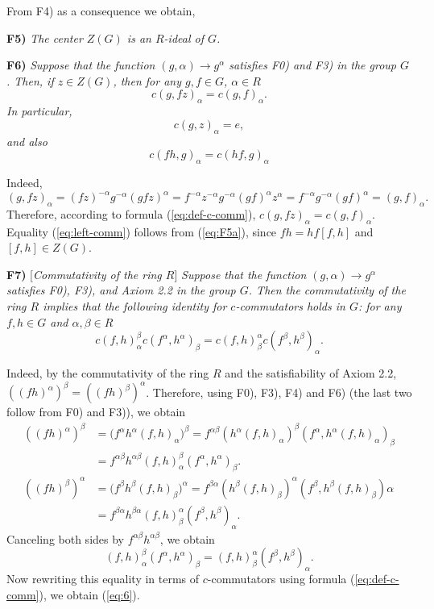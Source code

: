 \documentclass[11pt]{article}
\theoremstyle{definition}
\begin{document}
From F4) as a consequence we obtain,

\medskip
\noindent 
{\bf F5)} {\it The center $Z(G)$ is an $R$-ideal of $G$.} 

\medskip
\noindent 
{\bf F6)} {\it Suppose that the function $(g,\alpha) \to g^\alpha$ satisfies F0) and F3) in the group $G$. Then, if $z \in Z(G)$, then for any $g,f \in G$, $\alpha \in R$
\begin{equation} \label{eq:F5a}
    c(g,fz)_\alpha = c(g,f)_\alpha.
    \end{equation}
In particular,
\begin{equation} \label{eq:F5b}
    c(g,z)_\alpha = e,
    \end{equation}
    and also
  \begin{equation} \label{eq:left-comm}
    c(fh,g)_\alpha = c(hf,g)_\alpha
\end{equation}  
}

Indeed, 
$$
(g,fz)_\alpha = (fz)^{-\alpha}g^{-\alpha} (gfz)^\alpha = f^{-\alpha}z^{-\alpha}g^{-\alpha}(gf)^\alpha z^\alpha = f^{-\alpha}g^{-\alpha}(gf)^\alpha = (g,f)_\alpha.
$$
Therefore, according to formula (\ref{eq:def-c-comm}), $c(g,fz)_\alpha = c(g,f)_\alpha$. Equality (\ref{eq:left-comm}) follows from (\ref{eq:F5a}), since $fh = hf[f,h]$ and $[f,h] \in Z(G)$.

\medskip
\noindent
{\bf F7)} [{\it Commutativity of the ring $R$}] {\it Suppose that the function $(g,\alpha) \to g^\alpha$ satisfies F0), F3), and Axiom 2.2 in the group $G$. Then the commutativity of the ring $R$ implies that the following identity for $c$-commutators holds in $G$: for any $f,h \in G$ and $\alpha,\beta \in R$
\begin{equation} \label{eq:6}
c(f,h)_{\alpha}^{\beta}c(f^{\alpha},h^{\alpha})_{\beta}
=c(f,h)_{\beta}^{\alpha}c(f^{\beta},h^{\beta})_{\alpha}.
\end{equation}
}

Indeed, by the commutativity of the ring $R$ and the satisfiability of Axiom 2.2, $((fh)^\alpha)^\beta = ((fh)^\beta)^\alpha$. Therefore, using F0), F3), F4) and F6) (the last two follow from F0) and F3)), we obtain
\begin{align*}
((fh)^{\alpha})^{\beta} & =\big(f^{\alpha}h^{\alpha}(f,h)_{\alpha}\big)^{\beta}=
f^{\alpha\beta}(h^{\alpha}(f,h)_{\alpha})^{\beta}(f^{\alpha},h^{\alpha}(f,h)_{\alpha})_{\beta} \\
& =f^{\alpha\beta}h^{\alpha\beta}(f,h)_{\alpha}^{\beta}(f^{\alpha},h^{\alpha})_{\beta}. \\ 
((fh)^{\beta})^{\alpha} & =\big(f^{\beta}h^{\beta}(f,h)_{\beta}\big)^{\alpha}=f^{\beta\alpha}(h^{\beta}(f,h)_{\beta})^{\alpha}(f^{\beta},h^{\beta}(f,h)_{\beta}){\alpha} \\ 
& =f^{\beta\alpha}h^{\beta\alpha}(f,h)_{\beta}^{\alpha}(f^{\beta},h^{\beta})_{\alpha}.
\end{align*}
Canceling both sides by $f^{\alpha\beta}h^{\alpha\beta}$, we obtain
$$
(f,h)_{\alpha}^{\beta}(f^{\alpha},h^{\alpha})_{\beta}
=(f,h)_{\beta}^{\alpha}(f^{\beta},h^{\beta})_{\alpha}.
$$
Now rewriting this equality in terms of $c$-commutators using formula (\ref{eq:def-c-comm}), we obtain (\ref{eq:6}).
\end{document}
